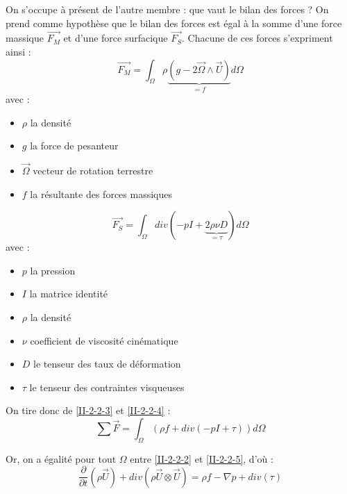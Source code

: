 On s'occupe à présent de l'autre membre : que vaut le bilan des forces ? On prend comme hypothèse que le bilan des forces est égal à la somme d'une force massique $\overrightarrow{F_M}$ et d'une force surfacique $\overrightarrow{F_S}$. Chacune de ces forces s'expriment ainsi :
\begin{equation} \label{II-2-2-3} \overrightarrow{F_M}=\int_{\Omega} \rho\underbrace{\left( g-2\overrightarrow{\Omega}\wedge \overrightarrow{U}\right)}_{=f} d\Omega \end{equation}
avec :
\begin{itemize}
	\item $\rho$ la densité
	\item $g$ la force de pesanteur
	\item $\overrightarrow{\Omega}$ vecteur de rotation terrestre
	\item $f$ la résultante des forces massiques
\end{itemize}

\begin{equation} \label{II-2-2-4} \overrightarrow{F_S}=\int_{\Omega} div\left( -pI+\underbrace{2\rho\nu D}_{=\tau}\right) d\Omega \end{equation}
avec :
\begin{itemize}
	\item $p$ la pression
	\item $I$ la matrice identité
	\item $\rho$ la densité
	\item $\nu$ coefficient de viscosité cinématique
	\item $D$ le tenseur des taux de déformation
	\item $\tau$ le tenseur des contraintes visqueuses
\end{itemize}

\bigskip
On tire donc de \ref{II-2-2-3} et \ref{II-2-2-4} :
\begin{equation}\label{II-2-2-5} \sum \overrightarrow{F}= \int_{\Omega} \left( \rho f + div\left( -pI+\tau\right) \right)d\Omega\end{equation}

Or, on a égalité pour tout $\Omega$ entre \ref{II-2-2-2} et \ref{II-2-2-5}, d'où :
\begin{equation} \label{II-2-2-6} \frac{\partial}{\partial t} \left( \rho \overrightarrow{U} \right) + div\left( \rho \overrightarrow{U} \otimes \overrightarrow{U}\right) = \rho f -\nabla p + div(\tau) \end{equation}

